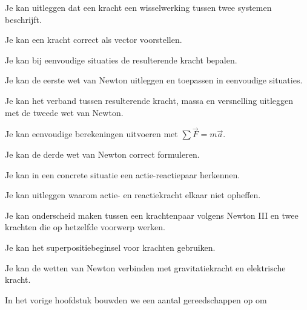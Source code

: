 \documentclass{ximera}
\begin{document}
\begin{leerdoelen}

 \item Je kan uitleggen dat een kracht een wisselwerking tussen twee systemen beschrijft.

 \item Je kan een kracht correct als vector voorstellen.

 \item Je kan bij eenvoudige situaties de resulterende kracht bepalen.

 \item Je kan de eerste wet van Newton uitleggen en toepassen in eenvoudige situaties.

 \item Je kan het verband tussen resulterende kracht, massa en versnelling uitleggen met de tweede wet van Newton.

 \item Je kan eenvoudige berekeningen uitvoeren met $\sum\vec F=m\vec a$.

 \item Je kan de derde wet van Newton correct formuleren.

 \item Je kan in een concrete situatie een actie-reactiepaar herkennen.

 \item Je kan uitleggen waarom actie- en reactiekracht elkaar niet opheffen.

 \item Je kan onderscheid maken tussen een krachtenpaar volgens Newton III en twee krachten die op hetzelfde voorwerp werken.

 \item Je kan het superpositiebeginsel voor krachten gebruiken.

 \item Je kan de wetten van Newton verbinden met gravitatiekracht en elektrische kracht.

\end{leerdoelen}






In het vorige hoofdstuk bouwden we een aantal gereedschappen op om
\end{document}
